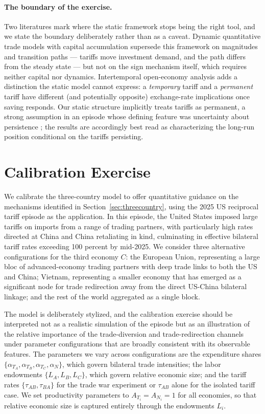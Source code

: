 \documentclass[11pt]{article}
\theoremstyle{plain}
\theoremstyle{remark}
\numberwithin{lemma}{section}
\numberwithin{proposition}{section}
\numberwithin{corollary}{section}
\newenvironment{revblock}{\par\begingroup\color{RevBlue}}{\endgroup\par}
\begin{document}
\begin{revblock}
\paragraph{The boundary of the exercise.} Two literatures mark where the static framework stops being the right tool, and we state the boundary deliberately rather than as a caveat. Dynamic quantitative trade models with capital accumulation \citep{eaton2016, caliendo2019} supersede this framework on magnitudes and transition paths --- tariffs move investment demand, and the path differs from the steady state --- but not on the sign mechanism itself, which requires neither capital nor dynamics. Intertemporal open-economy analysis \citep{obstfeld1996foundations} adds a distinction the static model cannot express: a \emph{temporary} tariff and a \emph{permanent} tariff have different (and potentially opposite) exchange-rate implications once saving responds. Our static structure implicitly treats tariffs as permanent, a strong assumption in an episode whose defining feature was uncertainty about persistence \citep{kalemli2025}; the results are accordingly best read as characterizing the long-run position conditional on the tariffs persisting.
\end{revblock}

\section{Calibration Exercise}
\label{sec:calibration}

We calibrate the three-country model to offer quantitative guidance on the mechanisms identified in Section~\ref{sec:threecountry}, using the 2025 US reciprocal tariff episode as the application. In this episode, the United States imposed large tariffs on imports from a range of trading partners, with particularly high rates directed at China and China retaliating in kind, culminating in effective bilateral tariff rates exceeding 100 percent by mid-2025. We consider three alternative configurations for the third economy $C$: the European Union, representing a large bloc of advanced-economy trading partners with deep trade links to both the US and China; Vietnam, representing a smaller economy that has emerged as a significant node for trade redirection away from the direct US-China bilateral linkage; and the rest of the world aggregated as a single block.

The model is deliberately stylized, and the calibration exercise should be interpreted not as a realistic simulation of the episode but as an illustration of the relative importance of the trade-diversion and trade-redirection channels under parameter configurations that are broadly consistent with its observable features. The parameters we vary across configurations are the expenditure shares $\{\alpha_{T_A}, \alpha_{T_B}, \alpha_{T_C}, \alpha_N\}$, which govern bilateral trade intensities; the labor endowments $\{L_A, L_B, L_C\}$, which govern relative economic size; and the tariff rates $\{\tau_{AB}, \tau_{BA}\}$ for the trade war experiment or $\tau_{AB}$ alone for the isolated tariff case. We set productivity parameters to $A_{T_i} = A_{N_i} = 1$ for all economies, so that relative economic size is captured entirely through the endowments $L_i$.
\end{document}
